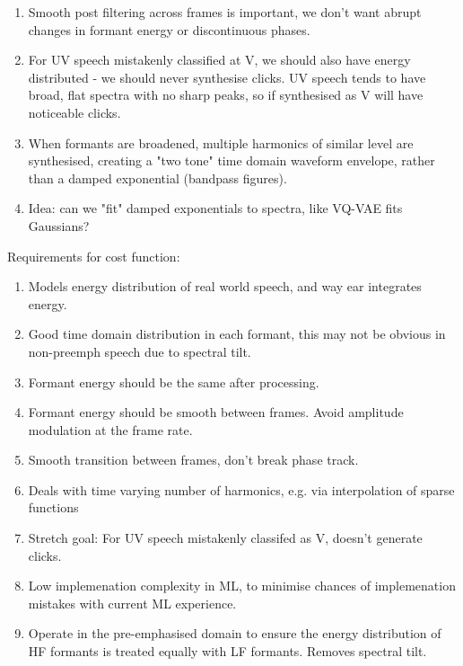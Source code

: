 \documentclass{article}
\begin{document}
\begin{enumerate}
\item Smooth post filtering across frames is important, we don't want abrupt changes in formant energy or discontinuous phases.
\item For UV speech mistakenly classified at V, we should also have energy distributed - we should never synthesise clicks.  UV speech tends to have broad, flat spectra with no sharp peaks, so if synthesised as V will have noticeable clicks.
\item When formants are broadened, multiple harmonics of similar level are synthesised, creating a "two tone" time domain waveform envelope, rather than a damped exponential (bandpass figures).
\item Idea: can we "fit" damped exponentials to spectra, like VQ-VAE fits Gaussians?
\end{enumerate}

Requirements for cost function:
\begin{enumerate}
\item Models energy distribution of real world speech, and way ear integrates energy.
\item Good time domain distribution in each formant, this may not be obvious in non-preemph speech due to spectral tilt.
\item Formant energy should be the same after processing.
\item Formant energy should be smooth between frames.  Avoid amplitude modulation at the frame rate.
\item Smooth transition between frames, don't break phase track.
\item Deals with time varying number of harmonics, e.g. via interpolation of sparse functions
\item Stretch goal: For UV speech mistakenly classifed as V, doesn't generate clicks.
\item Low implemenation complexity in ML, to minimise chances of implemenation mistakes with current ML experience.
\item Operate in the pre-emphasised domain to ensure the energy distribution of HF formants is treated equally with LF formants.  Removes spectral tilt.
\end{enumerate}
\end{document}
